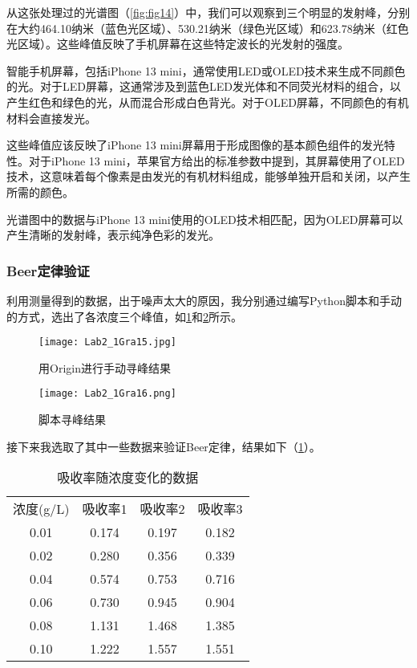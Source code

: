 \documentclass[dvipsnames, svgnames,a4paper,11pt]{article}
\begin{document}
\begin{enumerate}
		从这张处理过的光谱图（\cref{fig:fig14}）中，我们可以观察到三个明显的发射峰，分别在大约464.10纳米（蓝色光区域）、530.21纳米（绿色光区域）和623.78纳米（红色光区域）。这些峰值反映了手机屏幕在这些特定波长的光发射的强度。
		
		智能手机屏幕，包括iPhone 13 mini，通常使用LED或OLED技术来生成不同颜色的光。对于LED屏幕，这通常涉及到蓝色LED发光体和不同荧光材料的组合，以产生红色和绿色的光，从而混合形成白色背光。对于OLED屏幕，不同颜色的有机材料会直接发光。
		
		这些峰值应该反映了iPhone 13 mini屏幕用于形成图像的基本颜色组件的发光特性。对于iPhone 13 mini，苹果官方给出的标准参数中提到，其屏幕使用了OLED技术，这意味着每个像素是由发光的有机材料组成，能够单独开启和关闭，以产生所需的颜色。
		
		光谱图中的数据与iPhone 13 mini使用的OLED技术相匹配，因为OLED屏幕可以产生清晰的发射峰，表示纯净色彩的发光。		
		
	\end{enumerate}
	
	\clearpage
	\subsubsection{Beer定律验证}
	利用测量得到的数据，出于噪声太大的原因，我分别通过编写Python脚本和手动的方式，选出了各浓度三个峰值，如\cref{fig:fig15}和\cref{fig:fig16}所示。
	
	\begin{figure}[htbp]
		\centering
		\texttt{[image: Lab2\_1Gra15.jpg]}
		\caption{用Origin进行手动寻峰结果}
		\label{fig:fig15}
	\end{figure}
	
	\begin{figure}[htbp]
		\centering
		\texttt{[image: Lab2\_1Gra16.png]}
		\caption{脚本寻峰结果}
		\label{fig:fig16}
	\end{figure}
	
	\clearpage
	接下来我选取了其中一些数据来验证Beer定律，结果如下（\cref{tab:tab2}）。
	
	\begin{table}[htbp]
		\centering
		\caption{吸收率随浓度变化的数据}
		\begin{tabular}{|c|c|c|c|}
			\hline
			浓度(g/L) & 吸收率1 & 吸收率2 & 吸收率3 \\
			0.01  & 0.174 & 0.197 & 0.182 \\
			0.02  & 0.280 & 0.356 & 0.339 \\
			0.04  & 0.574 & 0.753 & 0.716 \\
			0.06  & 0.730 & 0.945 & 0.904 \\
			0.08  & 1.131 & 1.468 & 1.385 \\
			0.10  & 1.222 & 1.557 & 1.551 \\
			\hline
		\end{tabular}%
		\label{tab:tab2}%
	\end{table}%
	
\end{document}
